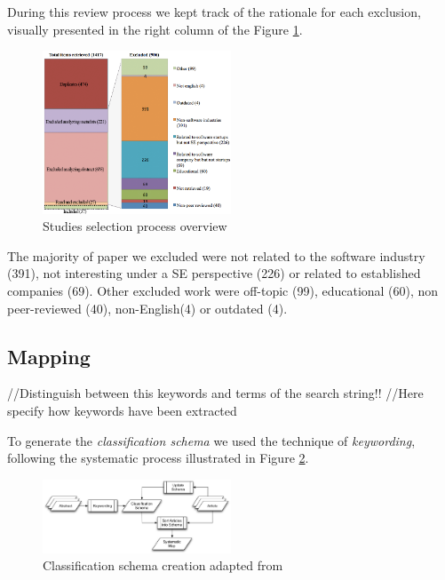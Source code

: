 \documentclass[final,5p,times,twocolumn]{elsarticle}
\begin{document}
During this review process we kept track of the rationale for each exclusion, visually presented in the right column of the Figure \ref{fig:ms:exclusion}.

\begin{figure}[H]
\centering
\includegraphics[width=0.5\textwidth,keepaspectratio=true]{figures/exclusion.png}
\caption{Studies selection process overview }
\label{fig:ms:exclusion}
\end{figure}

The majority of paper we excluded were not related to the software industry (391), not interesting under a SE perspective (226) or related to established companies (69). Other excluded work were off-topic (99), educational (60), non peer-reviewed (40), non-English(4) or outdated (4).  


\subsection{Mapping} %
\label{sub:mapping}
//Distinguish between this keywords and terms of the search string!!
//Here specify how keywords have been extracted

To generate the \textit{classification schema} we used the technique of \textit{keywording}, following the systematic process illustrated in Figure  \ref{fig:ms:keywording}.

\begin{figure}[H]
\centering
\includegraphics[width=0.5\textwidth,keepaspectratio=true]{figures/keywording.png}
\caption{Classification schema creation adapted from \cite{Petersen2007}}
\label{fig:ms:keywording}
\end{figure}
\end{document}

